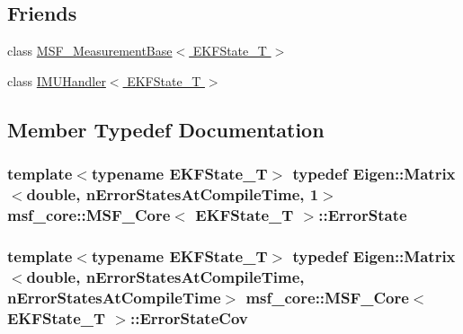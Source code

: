 \subsection*{Friends}
\begin{DoxyCompactItemize}
\item 
class \hyperlink{classmsf__core_1_1MSF__Core_a096bb61133872bdd266587ce54e931e6}{M\-S\-F\-\_\-\-Measurement\-Base$<$ E\-K\-F\-State\-\_\-\-T $>$}
\item 
class \hyperlink{classmsf__core_1_1MSF__Core_a868b4fae6ec6ad5b5ae95d1980ac1704}{I\-M\-U\-Handler$<$ E\-K\-F\-State\-\_\-\-T $>$}
\end{DoxyCompactItemize}


\subsection{Member Typedef Documentation}
\hypertarget{classmsf__core_1_1MSF__Core_a01a15136971c11456e539f00b88fbf1a}{
\subsubsection[{Error\-State}]{\setlength{\rightskip}{0pt plus 5cm}template$<$typename E\-K\-F\-State\-\_\-\-T$>$ typedef Eigen\-::\-Matrix$<$double, {\bf n\-Error\-States\-At\-Compile\-Time}, 1$>$ {\bf msf\-\_\-core\-::\-M\-S\-F\-\_\-\-Core}$<$ E\-K\-F\-State\-\_\-\-T $>$\-::{\bf Error\-State}}}\label{classmsf__core_1_1MSF__Core_a01a15136971c11456e539f00b88fbf1a}
\hypertarget{classmsf__core_1_1MSF__Core_ad9b84aa4937f3c8354045b5c97ba2dcc}{
\subsubsection[{Error\-State\-Cov}]{\setlength{\rightskip}{0pt plus 5cm}template$<$typename E\-K\-F\-State\-\_\-\-T$>$ typedef Eigen\-::\-Matrix$<$double, {\bf n\-Error\-States\-At\-Compile\-Time}, {\bf n\-Error\-States\-At\-Compile\-Time}$>$ {\bf msf\-\_\-core\-::\-M\-S\-F\-\_\-\-Core}$<$ E\-K\-F\-State\-\_\-\-T $>$\-::{\bf Error\-State\-Cov}}}\label{classmsf__core_1_1MSF__Core_ad9b84aa4937f3c8354045b5c97ba2dcc}
